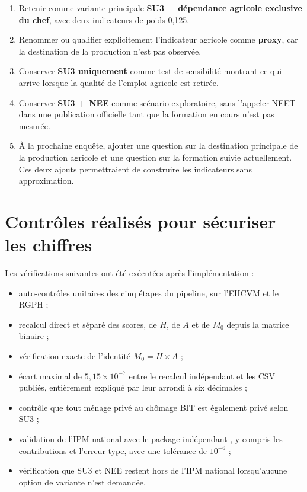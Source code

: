 \documentclass[11pt,a4paper]{article}
\begin{document}
\begin{enumerate}
  \item Retenir comme variante principale \textbf{SU3 + dépendance agricole exclusive du chef},
  avec deux indicateurs de poids 0,125.
  \item Renommer ou qualifier explicitement l'indicateur agricole comme \textbf{proxy}, car la
  destination de la production n'est pas observée.
  \item Conserver \textbf{SU3 uniquement} comme test de sensibilité montrant ce qui arrive lorsque
  la qualité de l'emploi agricole est retirée.
  \item Conserver \textbf{SU3 + NEE} comme scénario exploratoire, sans l'appeler NEET dans une
  publication officielle tant que la formation en cours n'est pas mesurée.
  \item À la prochaine enquête, ajouter une question sur la destination principale de la
  production agricole et une question sur la formation suivie actuellement. Ces deux ajouts
  permettraient de construire les indicateurs sans approximation.
\end{enumerate}

\section{Contrôles réalisés pour sécuriser les chiffres}

Les vérifications suivantes ont été exécutées après l'implémentation :

\begin{itemize}
  \item auto-contrôles unitaires des cinq étapes du pipeline, sur l'EHCVM et le RGPH ;
  \item recalcul direct et séparé des scores, de $H$, de $A$ et de $M_0$ depuis la matrice binaire ;
  \item vérification exacte de l'identité $M_0=H\times A$ ;
  \item écart maximal de $5,15\times10^{-7}$ entre le recalcul indépendant et les CSV publiés,
  entièrement expliqué par leur arrondi à six décimales ;
  \item contrôle que tout ménage privé au chômage BIT est également privé selon SU3 ;
  \item validation de l'IPM national avec le package indépendant , y compris les
  contributions et l'erreur-type, avec une tolérance de $10^{-6}$ ;
  \item vérification que SU3 et NEE restent hors de l'IPM national lorsqu'aucune option de
  variante n'est demandée.
\end{itemize}
\end{document}
